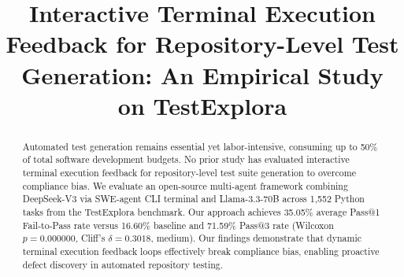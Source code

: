 \documentclass[conference]{IEEEtran}
\begin{document}
\title{Interactive Terminal Execution Feedback for Repository-Level Test Generation: An Empirical Study on TestExplora}

\author{
\and
{}
\and
{}
\and
{}
}

\maketitle

\begin{abstract}
Automated test generation remains essential yet labor-intensive, consuming up to 50\% of total software development budgets. No prior study has evaluated interactive terminal execution feedback for repository-level test suite generation to overcome compliance bias. We evaluate an open-source multi-agent framework combining DeepSeek-V3 via SWE-agent CLI terminal and Llama-3.3-70B across 1,552 Python tasks from the TestExplora benchmark. Our approach achieves 35.05\% average Pass@1 Fail-to-Pass rate versus 16.60\% baseline and 71.59\% Pass@3 rate (Wilcoxon $p=0.000000$, Cliff's $\delta=0.3018$, medium). Our findings demonstrate that dynamic terminal execution feedback loops effectively break compliance bias, enabling proactive defect discovery in automated repository testing.
\end{abstract}
\end{document}
